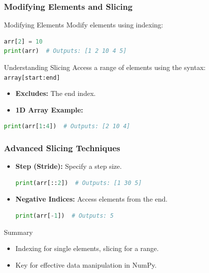 \documentclass{beamer}
\begin{document}
\begin{frame}[fragile]
    \frametitle{Modifying Elements and Slicing}
    \begin{block}{Modifying Elements}
        Modify elements using indexing:
        \begin{lstlisting}[language=Python]
arr[2] = 10
print(arr)  # Outputs: [1 2 10 4 5]
        \end{lstlisting}
    \end{block}
    \begin{block}{Understanding Slicing}
        Access a range of elements using the syntax: \texttt{array[start:end]}
        \begin{itemize}
            \item \textbf{Excludes:} The end index.
            \item \textbf{1D Array Example:}
        \end{itemize}
        \begin{lstlisting}[language=Python]
print(arr[1:4])  # Outputs: [2 10 4]
        \end{lstlisting}
    \end{block}
\end{frame}

\begin{frame}[fragile]
    \frametitle{Advanced Slicing Techniques}
    \begin{itemize}
        \item \textbf{Step (Stride):} Specify a step size.
        \begin{lstlisting}[language=Python]
print(arr[::2])  # Outputs: [1 30 5]
        \end{lstlisting}
        \item \textbf{Negative Indices:} Access elements from the end.
        \begin{lstlisting}[language=Python]
print(arr[-1])  # Outputs: 5
        \end{lstlisting}
    \end{itemize}
    \begin{block}{Summary}
        \begin{itemize}
            \item Indexing for single elements, slicing for a range.
            \item Key for effective data manipulation in NumPy.
        \end{itemize}
    \end{block}
\end{frame}
\end{document}
